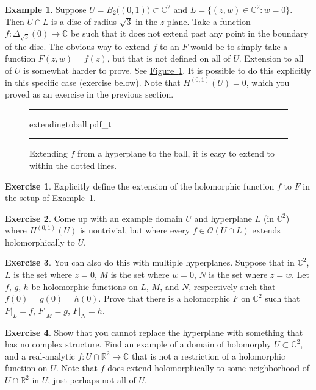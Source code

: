 \documentclass[12pt,openany]{book}
\newcommand{\C}{{\mathbb{C}}}
\newcommand{\R}{{\mathbb{R}}}
\newcommand{\sO}{{\mathscr{O}}}
\theoremstyle{plain}
\theoremstyle{remark}
\theoremstyle{definition}
\newenvironment{exbox}{%
    \def\FrameCommand{\vrule width 1pt \relax\hspace{10pt}}%
    \MakeFramed{\advance\hsize-\width\FrameRestore}%
}{%
    \endMakeFramed
}
\newenvironment{myfig}{%
\begin{figure}[h!t]
\noindent\rule{\textwidth}{0.5pt}\vspace{12pt}\par\centering}%
{\par\noindent\rule{\textwidth}{0.5pt}
\end{figure}}
\theoremstyle{exercise}
\newtheorem{exercise}{Exercise}[section]
\theoremstyle{example}
\newtheorem{example}[thm]{Example}
\newcommand{\figureref}[1]{\hyperref[#1]{Figure~\ref*{#1}}}
\newcommand{\exampleref}[1]{\hyperref[#1]{Example~\ref*{#1}}}
\begin{document}
\begin{example} \label{example:ballextend}
Suppose $U = B_2\bigl((0,1)\bigr) \subset \C^2$ and
$L = \{ (z,w) \in \C^2 : w = 0 \}$.
Then $U \cap L$ is a disc of radius $\sqrt{3}$ in the $z$-plane.
Take a function $f \colon \Delta_{\sqrt{3}}(0) \to \C$ be such that
it does not extend past any point in the boundary of the disc.
The obvious way to extend $f$ to an
$F$ would be to simply take a function $F(z,w) = f(z)$, but that is not
defined on all of $U$.
Extension to all of $U$ is somewhat harder to prove.  See
\figureref{fig:extendingtoball}.  It is possible to do this explicitly in
this specific case (exercise below).  Note that
$H^{(0,1)}(U) = 0$, which you proved
as an exercise in the previous section.
\begin{myfig}
{extendingtoball.pdf_t}
\caption{Extending $f$ from a hyperplane to the
ball,  it is easy to extend to within the dotted lines.\label{fig:extendingtoball}}
\end{myfig}
\end{example}

\begin{exbox}
\begin{exercise}
Explicitly define the extension of the holomorphic function $f$ to $F$
in the setup of \exampleref{example:ballextend}.
\end{exercise}

\begin{exercise}
Come up with an example domain $U$ and hyperplane $L$ (in $\C^2$)
where $H^{(0,1)}(U)$ is nontrivial, but where
every $f \in \sO(U \cap L)$ extends holomorphically to $U$.
\end{exercise}

\begin{exercise}
You can also do this with multiple hyperplanes.  Suppose that in $\C^2$,
$L$ is the set where $z=0$, $M$ is the set where $w=0$, $N$ is the set where
$z=w$.  Let $f$, $g$, $h$ be holomorphic functions on $L$, $M$, and $N$,
respectively such that $f(0)=g(0)=h(0)$.  Prove that there is a holomorphic
$F$ on $\C^2$ such that
$F|_L = f$,
$F|_M = g$,
$F|_N = h$.
\end{exercise}

\begin{exercise}
Show that you cannot replace the hyperplane with something that has no
complex structure.  Find an example of a domain of holomorphy $U \subset
\C^2$, and a real-analytic $f \colon U \cap \R^2 \to \C$
that is not a restriction of a holomorphic function on $U$.
Note that $f$ does extend holomorphically to some
neighborhood of $U \cap \R^2$ in $U$, just perhaps not all of $U$.
\end{exercise}
\end{exbox}
\end{document}
